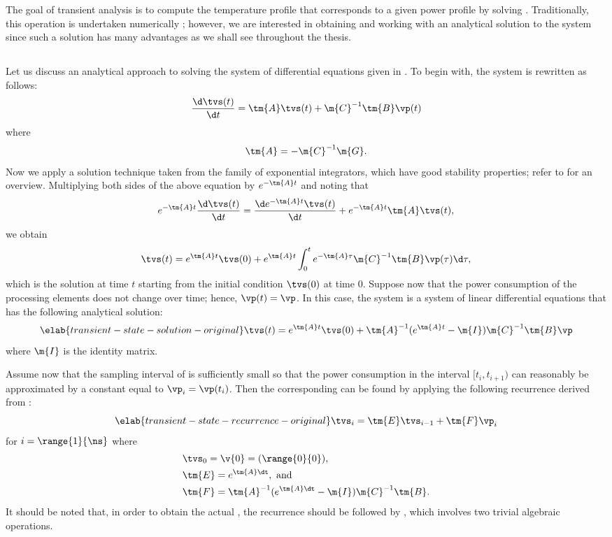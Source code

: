 The goal of transient analysis is to compute the temperature profile \mq that
corresponds to a given power profile \mp by solving
. Traditionally, this operation is undertaken
numerically \cite{skadron2003}; however, we are interested in obtaining and
working with an analytical solution to the system since such a solution has many
advantages as we shall see throughout the thesis.

\subsection{\priortitle}

Let us discuss an analytical approach to solving the system of differential
equations given in . To begin with, the
system is rewritten as follows:
\[
  \frac{\d \tvs(t)}{\d t} = \tm{A} \tvs(t) + \m{C}^{-1} \tm{B} \vp(t)
\]
where
\[
  \tm{A} = -\m{C}^{-1} \m{G}.
\]
Now we apply a solution technique taken from the family of exponential
integrators, which have good stability properties; refer to \cite{hochbruck2010}
for an overview. Multiplying both sides of the above equation by $e^{- \tm{A}
t}$ and noting that
\[
  e^{-\tm{A} t} \frac{\d \tvs(t)}{\d t} = \frac{\d e^{-\tm{A} t} \tvs(t)}{\d t} + e^{-\tm{A} t} \tm{A} \tvs(t),
\]
we obtain
\[
  \tvs(t) = e^{\tm{A} t} \tvs(0) +  e^{\tm{A} t} \int_0^t e^{-\tm{A} \tau} \m{C}^{-1} \tm{B} \vp(\tau) \d \tau,
\]
which is the solution at time $t$ starting from the initial condition $\tvs(0)$
at time 0. Suppose now that the power consumption of the processing elements
does not change over time; hence, $\vp(t) = \vp$. In this case, the system is a
system of linear differential equations that has the following analytical
solution:
\begin{equation} \elab{transient-state-solution-original}
  \tvs(t) = e^{\tm{A} t} \tvs(0) + \tm{A}^{-1} (e^{\tm{A} t} - \m{I}) \m{C}^{-1} \tm{B} \vp
\end{equation}
where $\m{I}$ is the identity matrix.

Assume now that the sampling interval \dt of \mp is sufficiently small so that
the power consumption in the interval $[t_i, t_{i + 1})$ can reasonably be
approximated by a constant equal to $\vp_i = \vp(t_i)$. Then the corresponding
\mq can be found by applying the following recurrence derived from
:
\begin{equation} \elab{transient-state-recurrence-original}
  \tvs_{i} = \tm{E} \tvs_{i - 1} + \tm{F} \vp_i
\end{equation}
for $i = \range{1}{\ns}$ where
\begin{align*}
  & \tvs_0 = \v{0} = (\range{0}{0}), \\
  & \tm{E} = e^{\tm{A} \dt}, \text{ and} \\
  & \tm{F} = \tm{A}^{-1}(e^{\tm{A} \dt} - \m{I})\m{C}^{-1} \tm{B}.
\end{align*}
It should be noted that, in order to obtain the actual \mq, the recurrence
should be followed by , which involves two
trivial algebraic operations.

